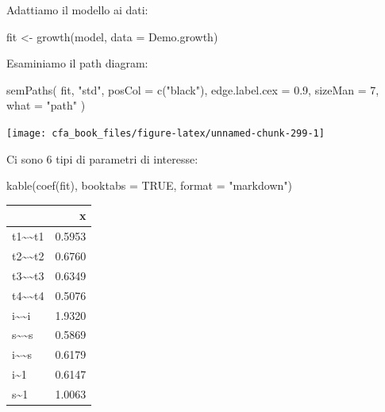 \documentclass[
  11pt,
]{krantz}
\makeatletter
\newenvironment{Shaded}{\begin{snugshade}}{\end{snugshade}}
\newcommand{\AttributeTok}[1]{\textcolor[rgb]{0.61,0.61,0.61}{#1}}
\newcommand{\ConstantTok}[1]{\textcolor[rgb]{0,0,0}{#1}}
\newcommand{\DecValTok}[1]{\textcolor[rgb]{0.06,0.06,0.06}{#1}}
\newcommand{\FloatTok}[1]{\textcolor[rgb]{0.06,0.06,0.06}{#1}}
\newcommand{\FunctionTok}[1]{\textcolor[rgb]{0,0,0}{#1}}
\newcommand{\NormalTok}[1]{#1}
\newcommand{\OtherTok}[1]{\textcolor[rgb]{0.37,0.37,0.37}{#1}}
\newcommand{\StringTok}[1]{\textcolor[rgb]{0.5,0.5,0.5}{#1}}
\newenvironment{kframe}{%
\medskip{}
\setlength{\fboxsep}{.8em}
 \def\at@end@of@kframe{}%
 \ifinner\ifhmode%
  \def\at@end@of@kframe{\end{minipage}}%
  \begin{minipage}{\columnwidth}%
 \fi\fi%
 \def\FrameCommand##1{\hskip\@totalleftmargin \hskip-\fboxsep
 \colorbox{shadecolor}{##1}\hskip-\fboxsep
     \hskip-\linewidth \hskip-\@totalleftmargin \hskip\columnwidth}%
 \MakeFramed {\advance\hsize-\width
   \@totalleftmargin\z@ \linewidth\hsize
   \@setminipage}}%
 {\par\unskip\endMakeFramed%
 \at@end@of@kframe}
\renewenvironment{Shaded}{\begin{kframe}}{\end{kframe}}
\theoremstyle{definition}
\theoremstyle{definition}
\theoremstyle{definition}
\theoremstyle{definition}
\theoremstyle{remark}
\makeatother
\begin{document}
Adattiamo il modello ai dati:

\begin{Shaded}
\begin{Highlighting}[]
\NormalTok{fit }\OtherTok{\textless{}{-}} \FunctionTok{growth}\NormalTok{(model, }\AttributeTok{data =}\NormalTok{ Demo.growth)}
\end{Highlighting}
\end{Shaded}

Esaminiamo il path diagram:

\begin{Shaded}
\begin{Highlighting}[]
\FunctionTok{semPaths}\NormalTok{(}
\NormalTok{  fit, }\StringTok{"std"}\NormalTok{,}
  \AttributeTok{posCol =} \FunctionTok{c}\NormalTok{(}\StringTok{"black"}\NormalTok{),}
  \AttributeTok{edge.label.cex =} \FloatTok{0.9}\NormalTok{,}
  \AttributeTok{sizeMan =} \DecValTok{7}\NormalTok{,}
  \AttributeTok{what =} \StringTok{"path"}
\NormalTok{)}
\end{Highlighting}
\end{Shaded}

\begin{center}\texttt{[image: cfa\_book\_files/figure-latex/unnamed-chunk-299-1]} \end{center}

Ci sono 6 tipi di parametri di interesse:

\begin{Shaded}
\begin{Highlighting}[]
\FunctionTok{kable}\NormalTok{(}\FunctionTok{coef}\NormalTok{(fit), }\AttributeTok{booktabs =} \ConstantTok{TRUE}\NormalTok{, }\AttributeTok{format =} \StringTok{"markdown"}\NormalTok{)}
\end{Highlighting}
\end{Shaded}

\begin{longtable}[]{@{}lr@{}}
\toprule
& x \\
\midrule
\endhead
t1\textasciitilde\textasciitilde t1 & 0.5953 \\
t2\textasciitilde\textasciitilde t2 & 0.6760 \\
t3\textasciitilde\textasciitilde t3 & 0.6349 \\
t4\textasciitilde\textasciitilde t4 & 0.5076 \\
i\textasciitilde\textasciitilde i & 1.9320 \\
s\textasciitilde\textasciitilde s & 0.5869 \\
i\textasciitilde\textasciitilde s & 0.6179 \\
i\textasciitilde1 & 0.6147 \\
s\textasciitilde1 & 1.0063 \\
\bottomrule
\end{longtable}
\end{document}
